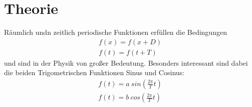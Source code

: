 

\section{Theorie}
Räumlich undn zeitlich periodische Funktionen erfüllen die Bedingungen
\begin{align*}
f(x)=f(x+D)\\
f(t)=f(t+T)
\end{align*}
und sind in der Physik von großer Bedeutung. Besonders interessant sind dabei die beiden Trigometrischen Funktionen Sinus und Cosinus:
\begin{align*}
f(t)=a~ sin\left(\frac{2\pi}{T}t\right)\\
f(t)=b~ cos\left(\frac{2\pi}{T}t\right)
\end{align*}

